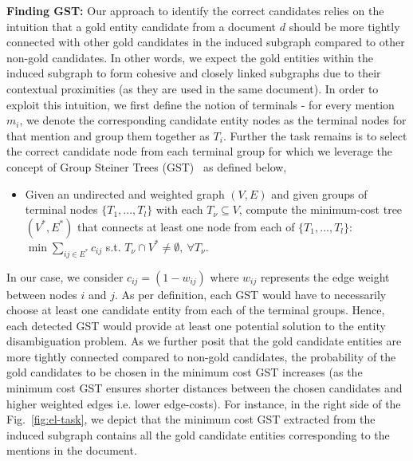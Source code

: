 \documentclass[11pt]{article}
\newcommand{\td}[1]{\textcolor{blue}{[{SP: #1}]}}
\begin{document}
\noindent
\textbf{Finding GST:} Our approach to identify the correct candidates
relies on the intuition that a gold entity candidate from a document $d$ should be more tightly connected with other gold candidates in the induced subgraph   
compared to other non-gold candidates.
In other words, we expect the gold entities within the induced subgraph to form cohesive and closely linked subgraphs due to their contextual proximities (as they are used in the same document).
In order to exploit this intuition, we first define the notion of terminals - for every mention $m_i$, we denote the corresponding candidate entity nodes as the terminal nodes for that mention and group them together as $T_i$. 
Further the task remains is to select the correct candidate node from each terminal group for which we leverage the concept of Group Steiner Trees (GST)~\cite{ding2006finding,pramanik2024uniqorn} as defined below,
\begin{itemize}[topsep=2pt,itemsep=0pt,partopsep=0pt, parsep=0pt]
\item Given an undirected and weighted graph \((V, E)\) and given groups of terminal nodes \(\{T_1, . . . ,T_l\}\) with each \(T_\nu \subseteq V\), compute the minimum-cost tree \((V^*, E^*)\) that connects at least one node from each of \(\{T_1, . . . ,T_l\}\): \(\min \sum_{ij \in E^*} c_{ij}\) s.t. \(T_\nu \cap V^* \ne \emptyset, \ \forall T_\nu\).
\end{itemize}
In our case, we consider $c_{ij}=(1 - w_{ij})$ where $w_{ij}$ represents the edge weight between nodes $i$ and $j$. 
As per definition, each GST would have to necessarily choose at least one candidate entity from each of the terminal groups. Hence, each detected GST would provide at least one potential solution to the entity disambiguation problem. 
As we further posit that the gold candidate entities are more tightly connected compared to non-gold candidates, the probability of the gold candidates to be chosen in the minimum cost GST increases (as the minimum cost GST ensures shorter distances between the chosen candidates and higher weighted edges i.e. lower edge-costs). For instance, in the right side of the Fig.~\ref{fig:el-task}, we depict that the minimum cost GST extracted from the induced subgraph contains all the gold candidate entities corresponding to the mentions in the document. 
\end{document}
